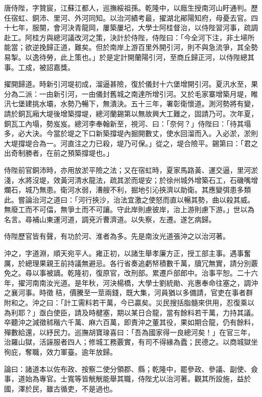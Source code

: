 \begin{pinyinscope}
唐侍陛，字贊宸，江蘇江都人，巡撫綏祖孫。乾隆中，以廕生授南河山盱通判。歷任宿虹、銅沛、里河、外河同知。以治河績考最，擢湖北鄖陽知府，母憂去官。四十七年，服闋，會河決青龍岡，屢築屢圮，大學士阿桂督治，以侍陛習河事，疏調赴工。阿桂方與總河議改河之策，決計於侍陛，侍陛曰：「今全河下注，非土埽所能當；欲逆挽歸正道，難矣。但於南岸上游百里外開引河，則不與急流爭，其全勢易掣。以逸待勞，此上策也。」於是定計開蘭陽引河，至商丘歸正河，以侍陛總其事。工成，被詔嘉獎。

擢開歸道。時新引河堤初成，溜逼甚險，復於儀封十六堡增開引河。夏汛水至，果分為二派：一由新引河，一由儀封舊城之南達所增引河。又於毛家寨增築月堤，睢汛七堡建挑水壩，水勢乃暢下，無潰決。五十三年，署彰衛懷道。測河勢將有變，請於銅瓦廂大堤後增築撐堤，總河蘭錫第以無故興大工難之，固請乃可。次年夏，銅瓦工內塌，勢岌岌。總河李奉翰新至，視河、曰：「奈何？」侍陛曰：「待其塌多，必大決。今當於堤之下口新築撐堤內掘開數丈，使水回溜而入。入必淤，淤則大堤撐堤合為一。河直注之力已殺，堤乃可保。」從之，堤合險平。錫第曰：「君之出奇制勝者，在前之預築撐堤也。」

侍陛前官銅沛時，亦用放淤平險之法；又在宿虹時，夏家馬路黃、運交逼，里河淤淺，水將沒堤，效黃河清水龍法，疏其淤而堤安；於徐州城外增築石工，石磯嘴增爛石，城乃無患。衛河水弱，漕艘不利，掘地引沁挾濟以助衛。其應變弭患多類此。嘗論治河之道曰：「河行挾沙，治法宜激之使怒而直以暢其勢，曲以殺其威。無廢工而不可偪，無爭土而不可讓。守此岸則慮彼岸，治上游則慮下游。」世以為名言。尋補山東運河道，調兗沂曹濟道。以失察，左遷。遂乞病歸。

侍陛歷官皆有聲，有功於河、淮者為多。先是南汝光道張沖之以治河著。

沖之，字道淵，順天宛平人。雍正初，以諸生舉孝廉方正，授工部主事。遇事奮厲，於總理果親王前持議無避忌。各行省奏追虧帑積數千萬，牘冗無實，請分別覈免之。尋以事被謫。乾隆初，復原官，改刑部。累遷戶部郎中。治事平恕。二十六年，擢河南南汝光道。是年秋，河決楊橋，大學士劉統勛、兆惠奉命往塞之，調沖之襄河事。時徵秸，價騰至一莖兩錢，既大集，河員猶以多備請，官吏在事者群附和之。沖之曰：「計工需料若干萬，今已贏矣。災民搜括脂髓來供用，忍復乘以為利耶？」亟白使臣，請及時楗塞，期以某日合龍，當有餘料若干萬，力持其議。卒聽沖之減徵秫稭六千萬、麻六百萬，即責沖之董其役，果如期合龍，仍有餘料，殫數給還，以紓民力。巡撫胡寶瑔喜曰：「吾為國家得一良總河矣！」在官三年，治羅山獄，活誣服者四人；修城工務覈實，有司不得緣為蠹；民德之。以商城獄坐徇庇，奪職，效力軍臺。逾年放歸。

論曰：諸道本以佐布政、按察二使分領郡、縣；乾隆中，罷參政、參議、副使、僉事，道始為專官。士寬等皆觥觥能舉其職，侍陛尤以治河著。觀其所設施，益於國，澤於民，雖古循吏，不是過也。


\end{pinyinscope}